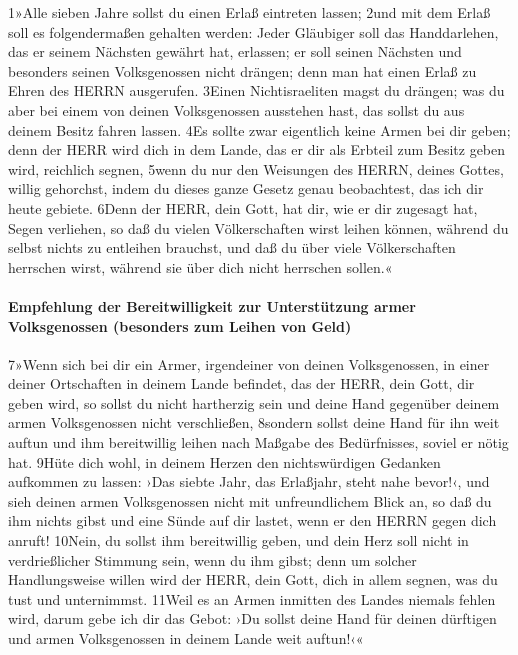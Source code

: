 1»Alle sieben Jahre sollst du einen Erlaß eintreten lassen; 2und mit dem
Erlaß soll es folgendermaßen gehalten werden: Jeder Gläubiger soll das
Handdarlehen, das er seinem Nächsten gewährt hat, erlassen; er soll
seinen Nächsten und besonders seinen Volksgenossen nicht drängen; denn
man hat einen Erlaß zu Ehren des HERRN ausgerufen. 3Einen
Nichtisraeliten magst du drängen; was du aber bei einem von deinen
Volksgenossen ausstehen hast, das sollst du aus deinem Besitz fahren
lassen. 4Es sollte zwar eigentlich keine Armen bei dir geben; denn der
HERR wird dich in dem Lande, das er dir als Erbteil zum Besitz geben
wird, reichlich segnen, 5wenn du nur den Weisungen des HERRN, deines
Gottes, willig gehorchst, indem du dieses ganze Gesetz genau
beobachtest, das ich dir heute gebiete. 6Denn der HERR, dein Gott, hat
dir, wie er dir zugesagt hat, Segen verliehen, so daß du vielen
Völkerschaften wirst leihen können, während du selbst nichts zu
entleihen brauchst, und daß du über viele Völkerschaften herrschen
wirst, während sie über dich nicht herrschen sollen.«

\hypertarget{empfehlung-der-bereitwilligkeit-zur-unterstuxfctzung-armer-volksgenossen-besonders-zum-leihen-von-geld}{%
\paragraph{Empfehlung der Bereitwilligkeit zur Unterstützung armer
Volksgenossen (besonders zum Leihen von
Geld)}\label{empfehlung-der-bereitwilligkeit-zur-unterstuxfctzung-armer-volksgenossen-besonders-zum-leihen-von-geld}}

7»Wenn sich bei dir ein Armer, irgendeiner von deinen Volksgenossen, in
einer deiner Ortschaften in deinem Lande befindet, das der HERR, dein
Gott, dir geben wird, so sollst du nicht hartherzig sein und deine Hand
gegenüber deinem armen Volksgenossen nicht verschließen, 8sondern sollst
deine Hand für ihn weit auftun und ihm bereitwillig leihen nach Maßgabe
des Bedürfnisses, soviel er nötig hat. 9Hüte dich wohl, in deinem Herzen
den nichtswürdigen Gedanken aufkommen zu lassen: ›Das siebte Jahr, das
Erlaßjahr, steht nahe bevor!‹, und sieh deinen armen Volksgenossen nicht
mit unfreundlichem Blick an, so daß du ihm nichts gibst und eine Sünde
auf dir lastet, wenn er den HERRN gegen dich anruft! 10Nein, du sollst
ihm bereitwillig geben, und dein Herz soll nicht in verdrießlicher
Stimmung sein, wenn du ihm gibst; denn um solcher Handlungsweise willen
wird der HERR, dein Gott, dich in allem segnen, was du tust und
unternimmst. 11Weil es an Armen inmitten des Landes niemals fehlen wird,
darum gebe ich dir das Gebot: ›Du sollst deine Hand für deinen dürftigen
und armen Volksgenossen in deinem Lande weit auftun!‹«

